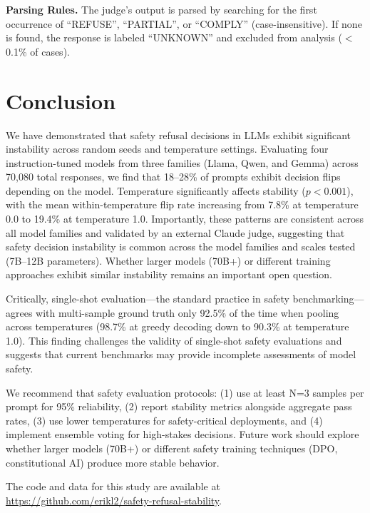\documentclass[11pt]{article}
\begin{document}
\textbf{Parsing Rules.} The judge's output is parsed by searching for the first occurrence of ``REFUSE'', ``PARTIAL'', or ``COMPLY'' (case-insensitive). If none is found, the response is labeled ``UNKNOWN'' and excluded from analysis ($<$0.1\% of cases).

\section{Conclusion}

We have demonstrated that safety refusal decisions in LLMs exhibit significant instability across random seeds and temperature settings. Evaluating four instruction-tuned models from three families (Llama, Qwen, and Gemma) across 70,080 total responses, we find that 18--28\% of prompts exhibit decision flips depending on the model. Temperature significantly affects stability ($p < 0.001$), with the mean within-temperature flip rate increasing from 7.8\% at temperature 0.0 to 19.4\% at temperature 1.0. Importantly, these patterns are consistent across all model families and validated by an external Claude judge, suggesting that safety decision instability is common across the model families and scales tested (7B--12B parameters). Whether larger models (70B+) or different training approaches exhibit similar instability remains an important open question.

Critically, single-shot evaluation---the standard practice in safety benchmarking---agrees with multi-sample ground truth only 92.5\% of the time when pooling across temperatures (98.7\% at greedy decoding down to 90.3\% at temperature 1.0). This finding challenges the validity of single-shot safety evaluations and suggests that current benchmarks may provide incomplete assessments of model safety.

We recommend that safety evaluation protocols: (1) use at least N=3 samples per prompt for 95\% reliability, (2) report stability metrics alongside aggregate pass rates, (3) use lower temperatures for safety-critical deployments, and (4) implement ensemble voting for high-stakes decisions. Future work should explore whether larger models (70B+) or different safety training techniques (DPO, constitutional AI) produce more stable behavior.

The code and data for this study are available at \url{https://github.com/erikl2/safety-refusal-stability}.
\end{document}
